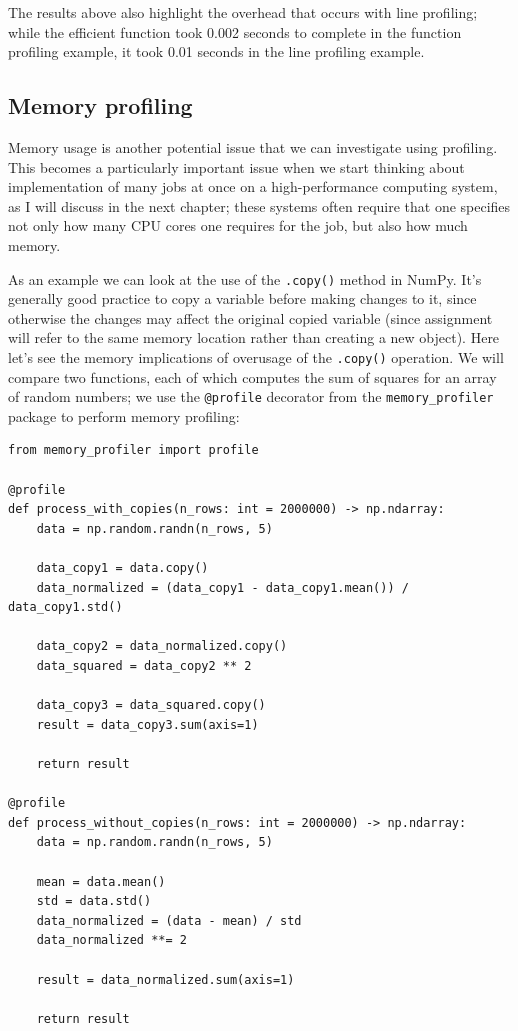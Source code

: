 The results above also highlight the overhead that occurs with line profiling; while the efficient function took 0.002 seconds to complete in the function profiling example, it took 0.01 seconds in the line profiling example.

\subsection{Memory profiling}

Memory usage is another potential issue that we can investigate using profiling.  This becomes a particularly important issue when we start thinking about implementation of many jobs at once on a high-performance computing system, as I will discuss in the next chapter; these systems often require that one specifies not only how many CPU cores one requires for the job, but also how much memory.

As an example we can look at the use of the \texttt{.copy()} method in NumPy.  It's generally good practice to copy a variable before making changes to it, since otherwise the changes may affect the original copied variable (since assignment will refer to the same memory location rather than creating a new object).  Here let's see the memory implications of overusage of the \texttt{.copy()} operation.  We will compare two functions, each of which computes the sum of squares for an array of random numbers; we use the \texttt{@profile} decorator from the \texttt{memory\_profiler} package to perform memory profiling:

\begin{lstlisting}[style=Python]
from memory_profiler import profile

@profile
def process_with_copies(n_rows: int = 2000000) -> np.ndarray:
    data = np.random.randn(n_rows, 5)
    
    data_copy1 = data.copy() 
    data_normalized = (data_copy1 - data_copy1.mean()) / data_copy1.std()
    
    data_copy2 = data_normalized.copy() 
    data_squared = data_copy2 ** 2
    
    data_copy3 = data_squared.copy() 
    result = data_copy3.sum(axis=1)
    
    return result

@profile
def process_without_copies(n_rows: int = 2000000) -> np.ndarray:
    data = np.random.randn(n_rows, 5)
    
    mean = data.mean()
    std = data.std()
    data_normalized = (data - mean) / std  
    data_normalized **= 2  
    
    result = data_normalized.sum(axis=1)
    
    return result
\end{lstlisting}

